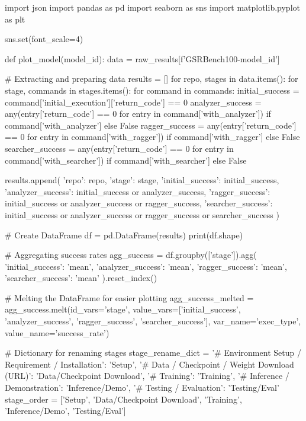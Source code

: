 import json
import pandas as pd
import seaborn as sns
import matplotlib.pyplot as plt

sns.set(font_scale=4)

def plot_model(model_id):
    data = raw_results[f'GSRBench100-{model_id}']

    # Extracting and preparing data
    results = []
    for repo, stages in data.items():
        for stage, commands in stages.items():
            for command in commands:
                initial_success = command['initial_execution']['return_code'] == 0
                analyzer_success = any(entry['return_code'] == 0 for entry in command['with_analyzer']) if command['with_analyzer'] else False
                ragger_success = any(entry['return_code'] == 0 for entry in command['with_ragger']) if command['with_ragger'] else False
                searcher_success = any(entry['return_code'] == 0 for entry in command['with_searcher']) if command['with_searcher'] else False
                
                results.append({
                    'repo': repo,
                    'stage': stage,
                    'initial_success': initial_success,
                    'analyzer_success': initial_success or analyzer_success,
                    'ragger_success': initial_success or analyzer_success or ragger_success,
                    'searcher_success': initial_success or analyzer_success or ragger_success or searcher_success
                })

    # Create DataFrame
    df = pd.DataFrame(results)
    print(df.shape)

    # Aggregating success rates
    agg_success = df.groupby(['stage']).agg({
        'initial_success': 'mean',
        'analyzer_success': 'mean',
        'ragger_success': 'mean',
        'searcher_success': 'mean'
    }).reset_index()

    # Melting the DataFrame for easier plotting
    agg_success_melted = agg_success.melt(id_vars='stage', value_vars=['initial_success', 'analyzer_success', 'ragger_success', 'searcher_success'], var_name='exec_type', value_name='success_rate')

    # Dictionary for renaming stages
    stage_rename_dict = {
        '# Environment Setup / Requirement / Installation': 'Setup',
        '# Data / Checkpoint / Weight Download (URL)': 'Data/Checkpoint Download',
        '# Training': 'Training',
        '# Inference / Demonstration': 'Inference/Demo',
        '# Testing / Evaluation': 'Testing/Eval'
    }
    stage_order = ['Setup', 'Data/Checkpoint Download', 'Training', 'Inference/Demo', 'Testing/Eval']

